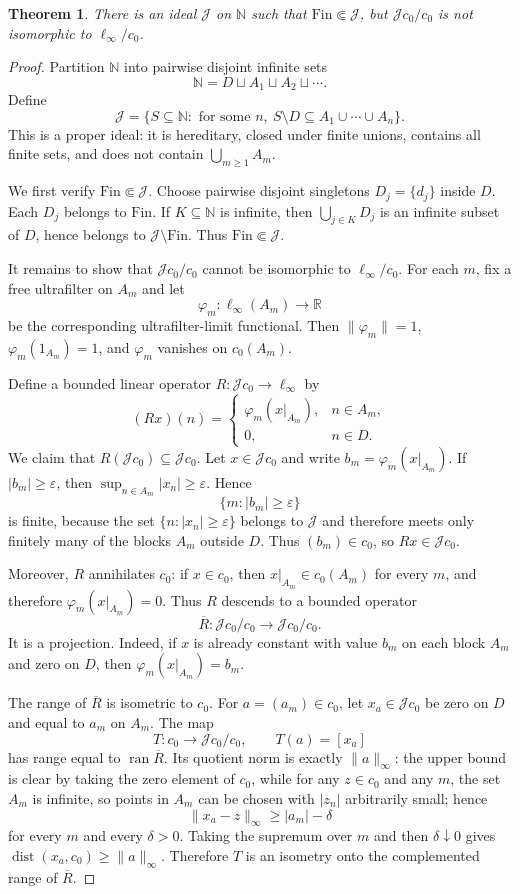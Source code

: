 \documentclass[11pt]{article}
\newtheorem{theorem}{Theorem}
\newcommand{\N}{\mathbb N}
\newcommand{\Fin}{\mathrm{Fin}}
\newcommand{\J}{\mathcal J}
\begin{document}
\begin{theorem}
There is an ideal $\J$ on $\N$ such that $\Fin\Subset\J$, but
$\J c_0/c_0$ is not isomorphic to $\ell_\infty/c_0$.
\end{theorem}

\begin{proof}
Partition $\N$ into pairwise disjoint infinite sets
\[
   \N=D\sqcup A_1\sqcup A_2\sqcup\cdots .
\]
Define
\[
   \J=\{S\subseteq\N:\text{ for some }n,\ 
       S\setminus D\subseteq A_1\cup\cdots\cup A_n\}.
\]
This is a proper ideal: it is hereditary, closed under finite unions,
contains all finite sets, and does not contain $\bigcup_{m\ge1}A_m$.

We first verify $\Fin\Subset\J$.  Choose pairwise disjoint singletons
$D_j=\{d_j\}$ inside $D$.  Each $D_j$ belongs to $\Fin$.  If
$K\subseteq\N$ is infinite, then $\bigcup_{j\in K}D_j$ is an infinite
subset of $D$, hence belongs to $\J\setminus\Fin$.  Thus
$\Fin\Subset\J$.

It remains to show that $\J c_0/c_0$ cannot be isomorphic to
$\ell_\infty/c_0$.  For each $m$, fix a free ultrafilter on $A_m$ and
let
\[
   \varphi_m:\ell_\infty(A_m)\to\mathbb R
\]
be the corresponding ultrafilter-limit functional.  Then
$\|\varphi_m\|=1$, $\varphi_m(1_{A_m})=1$, and
$\varphi_m$ vanishes on $c_0(A_m)$.

Define a bounded linear operator $R:\J c_0\to \ell_\infty$ by
\[
   (Rx)(n)=
   \begin{cases}
   \varphi_m(x|_{A_m}), & n\in A_m,\\
   0, & n\in D.
   \end{cases}
\]
We claim that $R(\J c_0)\subseteq \J c_0$.  Let $x\in\J c_0$ and
write $b_m=\varphi_m(x|_{A_m})$.  If $|b_m|\ge\varepsilon$, then
$\sup_{n\in A_m}|x_n|\ge\varepsilon$.  Hence
\[
   \{m: |b_m|\ge\varepsilon\}
\]
is finite, because the set
$\{n:|x_n|\ge\varepsilon\}$ belongs to $\J$ and therefore meets only
finitely many of the blocks $A_m$ outside $D$.  Thus $(b_m)\in c_0$,
so $Rx\in\J c_0$.

Moreover, $R$ annihilates $c_0$: if $x\in c_0$, then
$x|_{A_m}\in c_0(A_m)$ for every $m$, and therefore
$\varphi_m(x|_{A_m})=0$.  Thus $R$ descends to a bounded operator
\[
   \overline R:\J c_0/c_0\longrightarrow \J c_0/c_0 .
\]
It is a projection.  Indeed, if $x$ is already constant with value
$b_m$ on each block $A_m$ and zero on $D$, then
$\varphi_m(x|_{A_m})=b_m$.

The range of $\overline R$ is isometric to $c_0$.  For
$a=(a_m)\in c_0$, let $x_a\in\J c_0$ be zero on $D$ and equal to
$a_m$ on $A_m$.  The map
\[
   T:c_0\to \J c_0/c_0,\qquad T(a)=[x_a]
\]
has range equal to $\operatorname{ran}\overline R$.  Its quotient norm
is exactly $\|a\|_\infty$: the upper bound is clear by taking the zero
element of $c_0$, while for any $z\in c_0$ and any $m$, the set $A_m$
is infinite, so points in $A_m$ can be chosen with $|z_n|$ arbitrarily
small; hence
\[
   \|x_a-z\|_\infty\ge |a_m|-\delta
\]
for every $m$ and every $\delta>0$.  Taking the supremum over $m$ and
then $\delta\downarrow0$ gives
$\operatorname{dist}(x_a,c_0)\ge\|a\|_\infty$.  Therefore
$T$ is an isometry onto the complemented range of $\overline R$.


\end{proof}
\end{document}
